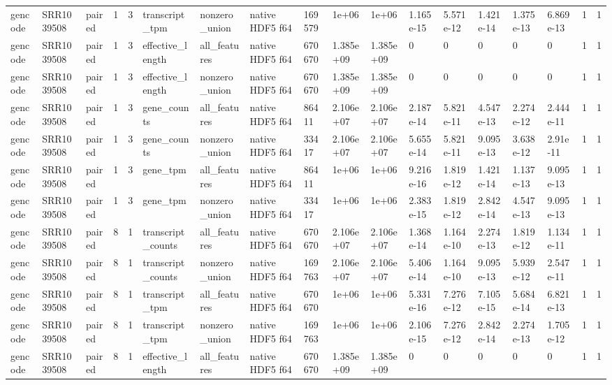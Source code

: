 \begin{tabular}{llllllllllllllllll}
gencode & SRR1039508 & paired & 1 & 3 & transcript\_tpm & nonzero\_union & native HDF5 f64 & 169579 & 1e+06 & 1e+06 & 1.165e-15 & 5.571e-12 & 1.421e-14 & 1.375e-13 & 6.869e-13 & 1 & 1 \\
gencode & SRR1039508 & paired & 1 & 3 & effective\_length & all\_features & native HDF5 f64 & 670670 & 1.385e+09 & 1.385e+09 & 0 & 0 & 0 & 0 & 0 & 1 & 1 \\
gencode & SRR1039508 & paired & 1 & 3 & effective\_length & nonzero\_union & native HDF5 f64 & 670670 & 1.385e+09 & 1.385e+09 & 0 & 0 & 0 & 0 & 0 & 1 & 1 \\
gencode & SRR1039508 & paired & 1 & 3 & gene\_counts & all\_features & native HDF5 f64 & 86411 & 2.106e+07 & 2.106e+07 & 2.187e-14 & 5.821e-11 & 4.547e-13 & 2.274e-12 & 2.444e-11 & 1 & 1 \\
gencode & SRR1039508 & paired & 1 & 3 & gene\_counts & nonzero\_union & native HDF5 f64 & 33417 & 2.106e+07 & 2.106e+07 & 5.655e-14 & 5.821e-11 & 9.095e-13 & 3.638e-12 & 2.91e-11 & 1 & 1 \\
gencode & SRR1039508 & paired & 1 & 3 & gene\_tpm & all\_features & native HDF5 f64 & 86411 & 1e+06 & 1e+06 & 9.216e-16 & 1.819e-12 & 1.421e-14 & 1.137e-13 & 9.095e-13 & 1 & 1 \\
gencode & SRR1039508 & paired & 1 & 3 & gene\_tpm & nonzero\_union & native HDF5 f64 & 33417 & 1e+06 & 1e+06 & 2.383e-15 & 1.819e-12 & 2.842e-14 & 4.547e-13 & 9.095e-13 & 1 & 1 \\
gencode & SRR1039508 & paired & 8 & 1 & transcript\_counts & all\_features & native HDF5 f64 & 670670 & 2.106e+07 & 2.106e+07 & 1.368e-14 & 1.164e-10 & 2.274e-13 & 1.819e-12 & 1.134e-11 & 1 & 1 \\
gencode & SRR1039508 & paired & 8 & 1 & transcript\_counts & nonzero\_union & native HDF5 f64 & 169763 & 2.106e+07 & 2.106e+07 & 5.406e-14 & 1.164e-10 & 9.095e-13 & 5.939e-12 & 2.547e-11 & 1 & 1 \\
gencode & SRR1039508 & paired & 8 & 1 & transcript\_tpm & all\_features & native HDF5 f64 & 670670 & 1e+06 & 1e+06 & 5.331e-16 & 7.276e-12 & 7.105e-15 & 5.684e-14 & 6.821e-13 & 1 & 1 \\
gencode & SRR1039508 & paired & 8 & 1 & transcript\_tpm & nonzero\_union & native HDF5 f64 & 169763 & 1e+06 & 1e+06 & 2.106e-15 & 7.276e-12 & 2.842e-14 & 2.274e-13 & 1.705e-12 & 1 & 1 \\
gencode & SRR1039508 & paired & 8 & 1 & effective\_length & all\_features & native HDF5 f64 & 670670 & 1.385e+09 & 1.385e+09 & 0 & 0 & 0 & 0 & 0 & 1 & 1 \\

\end{tabular}
